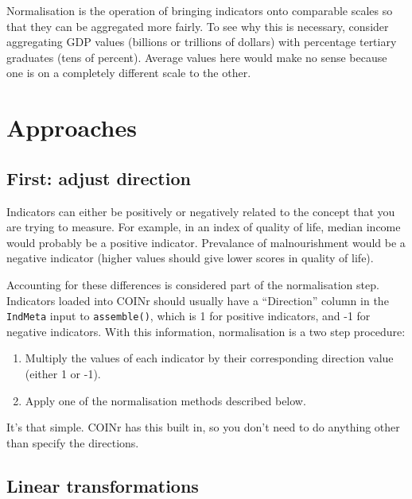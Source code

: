 \documentclass[
]{book}
\providecommand{\tightlist}{%
  \setlength{\itemsep}{0pt}\setlength{\parskip}{0pt}}
\begin{document}
Normalisation is the operation of bringing indicators onto comparable scales so that they can be aggregated more fairly. To see why this is necessary, consider aggregating GDP values (billions or trillions of dollars) with percentage tertiary graduates (tens of percent). Average values here would make no sense because one is on a completely different scale to the other.

\hypertarget{approaches}{%
\section{Approaches}\label{approaches}}

\hypertarget{first-adjust-direction}{%
\subsection{First: adjust direction}\label{first-adjust-direction}}

Indicators can either be positively or negatively related to the concept that you are trying to measure. For example, in an index of quality of life, median income would probably be a positive indicator. Prevalance of malnourishment would be a negative indicator (higher values should give lower scores in quality of life).

Accounting for these differences is considered part of the normalisation step. Indicators loaded into COINr should usually have a ``Direction'' column in the \texttt{IndMeta} input to \texttt{assemble()}, which is 1 for positive indicators, and -1 for negative indicators. With this information, normalisation is a two step procedure:

\begin{enumerate}
\def\labelenumi{\arabic{enumi}.}
\tightlist
\item
  Multiply the values of each indicator by their corresponding direction value (either 1 or -1).
\item
  Apply one of the normalisation methods described below.
\end{enumerate}

It's that simple. COINr has this built in, so you don't need to do anything other than specify the directions.

\hypertarget{linear-transformations}{%
\subsection{Linear transformations}\label{linear-transformations}}
\end{document}
